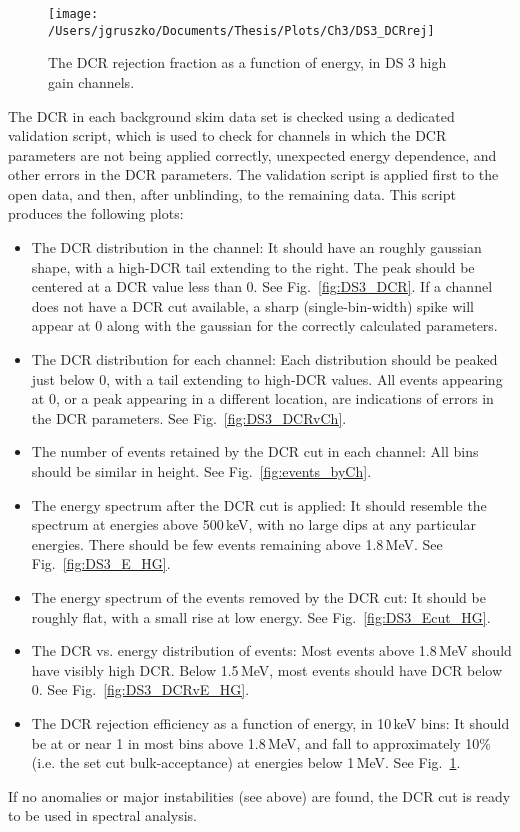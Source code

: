  \begin{figure}[t]
   \centering
   \texttt{[image: /Users/jgruszko/Documents/Thesis/Plots/Ch3/DS3\_DCRrej]}
    \caption{The DCR rejection fraction as a function of energy, in DS 3 high gain channels.}
    \label{fig:DS3_DCRrej}
  \end{figure}

The DCR in each background skim data set is checked using a dedicated validation script, which is used to check for channels in which the DCR parameters are not being applied correctly, unexpected energy dependence, and other errors in the DCR parameters.  The validation script is applied first to the open data, and then, after unblinding, to the remaining data. This script produces the following plots:
\begin{itemize}
\item The DCR distribution in the channel: It should have an roughly gaussian shape, with a high-DCR tail extending to the right. The peak should be centered at a DCR value less than 0. See Fig.~\ref{fig:DS3_DCR}. If a channel does not have a DCR cut available, a sharp (single-bin-width) spike will appear at 0 along with the gaussian for the correctly calculated parameters. 
\item The DCR distribution for each channel: Each distribution should be peaked just below 0, with a tail extending to high-DCR values. All events appearing at 0, or a peak appearing in a different location, are indications of errors in the DCR parameters. See Fig.~\ref{fig:DS3_DCRvCh}.
\item The number of events retained by the DCR cut in each channel: All bins should be similar in height. See Fig.~\ref{fig:events_byCh}.
\item The energy spectrum after the DCR cut is applied: It should resemble the \twonubb spectrum at energies above 500\,keV, with no large dips at any particular energies. There should be few events remaining above 1.8\,MeV. See Fig.~\ref{fig:DS3_E_HG}.
\item The energy spectrum of the events removed by the DCR cut: It should be roughly flat, with a small rise at low energy. See Fig.~\ref{fig:DS3_Ecut_HG}.
\item The DCR vs. energy distribution of events: Most events above 1.8\,MeV should have visibly high DCR. Below 1.5\,MeV, most events should have DCR below 0. See Fig.~\ref{fig:DS3_DCRvE_HG}.
\item The DCR rejection efficiency as a function of energy, in 10\,keV bins: It should be at or near 1 in most bins above 1.8\,MeV, and fall to approximately 10\% (i.e. the set cut bulk-acceptance) at energies below 1\,MeV. See Fig.~\ref{fig:DS3_DCRrej}.
\end{itemize}

If no anomalies or major instabilities (see above) are found, the DCR cut is ready to be used in spectral analysis. 

